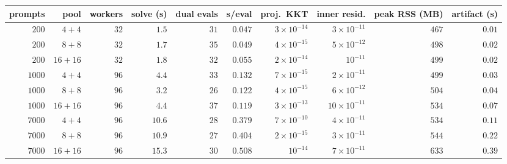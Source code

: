 \begin{tabular}{rrrrrrrrrr}
\toprule
prompts & pool & workers & solve (s) & dual evals & s/eval & proj.\ KKT & inner resid. & peak RSS (MB) & artifact (s)\\
\midrule
$200$ & $4{+}4$ & $32$ & $1.5$ & $31$ & $0.047$ & $3\times10^{-14}$ & $3\times10^{-11}$ & $467$ & $0.01$\\
$200$ & $8{+}8$ & $32$ & $1.7$ & $35$ & $0.049$ & $4\times10^{-15}$ & $5\times10^{-12}$ & $498$ & $0.02$\\
$200$ & $16{+}16$ & $32$ & $1.8$ & $32$ & $0.055$ & $2\times10^{-14}$ & $10^{-11}$ & $499$ & $0.02$\\
$1000$ & $4{+}4$ & $96$ & $4.4$ & $33$ & $0.132$ & $7\times10^{-15}$ & $2\times10^{-11}$ & $499$ & $0.03$\\
$1000$ & $8{+}8$ & $96$ & $3.2$ & $26$ & $0.122$ & $4\times10^{-15}$ & $6\times10^{-12}$ & $504$ & $0.04$\\
$1000$ & $16{+}16$ & $96$ & $4.4$ & $37$ & $0.119$ & $3\times10^{-13}$ & $10\times10^{-11}$ & $534$ & $0.07$\\
$7000$ & $4{+}4$ & $96$ & $10.6$ & $28$ & $0.379$ & $7\times10^{-10}$ & $4\times10^{-11}$ & $534$ & $0.11$\\
$7000$ & $8{+}8$ & $96$ & $10.9$ & $27$ & $0.404$ & $2\times10^{-15}$ & $3\times10^{-11}$ & $544$ & $0.22$\\
$7000$ & $16{+}16$ & $96$ & $15.3$ & $30$ & $0.508$ & $10^{-14}$ & $7\times10^{-11}$ & $633$ & $0.39$\\
\bottomrule
\end{tabular}
